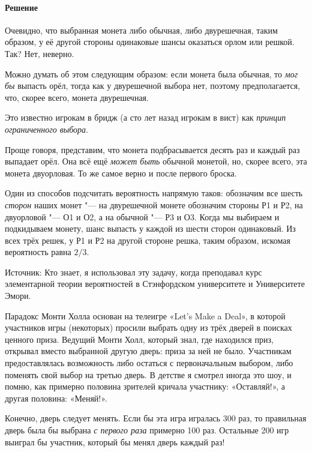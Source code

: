 \documentclass[twoside]{book}
\begin{document}
\paragraph{Решение}
Очевидно, что выбранная монета либо обычная, либо двурешечная, таким образом, у её другой стороны одинаковые шансы оказаться орлом или решкой.
Так?
Нет, неверно.

Можно думать об этом следующим образом: если монета была обычная, то \emph{мог бы} выпасть орёл, тогда как у двурешечной выбора нет, поэтому предполагается, что, скорее всего, монета двурешечная.

Это известно игрокам в бридж (а сто лет назад игрокам в вист) как \emph{принцип ограниченного выбора}.

Проще говоря, представим, что монета подбрасывается десять раз и каждый раз выпадает орёл.
Она всё ещё \emph{может быть} обычной монетой, но, скорее всего, эта монета двуорловая.
То же самое верно и после первого броска.

Один из способов подсчитать вероятность напрямую таков:
обозначим все шесть \emph{сторон} наших монет "---
на двурешечной монете обозначим стороны Р1 и Р2, на двуорловой "--- О1 и О2, а на обычной "--- Р3 и О3.
Когда мы выбираем и подкидываем монету, шанс выпасть у каждой из шести сторон одинаковый.
Из всех трёх решек, у Р1 и Р2 на другой стороне решка, таким образом, искомая вероятность равна $2/3$.\heart

\medskip
{\small 
Источник: Кто знает, я использовал эту задачу, когда преподавал курс элементарной теории вероятностей в Стэнфордском университете и Университете Эмори.

}
\medskip

Парадокс Монти Холла основан на телеигре «Let’s Make a Deal», в которой участников игры (некоторых) просили выбрать одну из трёх дверей в поисках ценного приза.
Ведущий Монти Холл, который знал, где находился приз, открывал вместо выбранной другую дверь: приза за ней не было.
Участникам предоставлялась возможность либо остаться с первоначальным выбором, либо поменять свой выбор на третью дверь.
В детстве я смотрел иногда это шоу, и помню, как примерно половина зрителей кричала участнику: «Оставляй!», а другая половина: «Меняй!».

Конечно, дверь следует менять.
Если бы эта игра игралась 300 раз, то правильная дверь была бы выбрана \emph{с первого раза} примерно 100 раз.
Остальные 200 игр выиграл бы участник, который бы менял дверь каждый раз!

\end{document}
